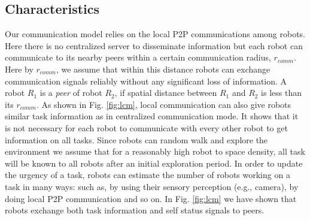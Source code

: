 \documentclass[letterpaper, 10 pt, times, conference]{ieeeconf} %
\begin{document}
\subsection{Characteristics}
Our communication model relies on the local P2P communications among robots. Here there is no centralized server to disseminate information but each robot can communicate to its nearby peers within a certain communication radius, $r_{comm}$. Here by $r_{comm}$, we assume that within this distance robots can exchange communication signals reliably without any significant loss of information. A robot $R_1$ is a {\em peer} of robot $R_2$, if spatial distance between $R_1$ and $R_2$ is less than its $r_{comm}$. As shown in Fig. \ref{fig:lcm}, local communication can also give robots similar task information as in centralized communication mode. It shows that it is not necessary for each robot to communicate with every other robot to get information on all tasks. Since robots can random walk and explore the environment we assume that for a reasonably high robot to space density, all task will be known to all robots after an initial exploration period. In order to update the urgency of a task, robots can estimate the number of robots working on a task in many ways: such as, by using their sensory perception (e.g., camera), by doing local P2P communication and so on. In Fig. \ref{fig:lcm} we have shown that robots exchange both task information and self status signals to peers.\\
\end{document}
